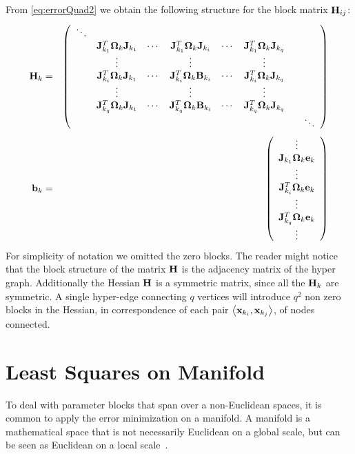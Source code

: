 \documentclass[a4paper]{article}
\begin{document}
From \eqref{eq:errorQuad2} we obtain the following structure for the block matrix $\mathbf{H}_{ij}$:
\begin{eqnarray}
\mathbf{H}_{k}&=&\left(
\begin{array}{cccccccc}
\ddots & & & & & & &\\
& \mathbf{J}_{k_1}^T \mathbf{\Omega}_{k} \mathbf{J}_{k_1} & \cdots & \mathbf{J}_{k_1}^T \mathbf{\Omega}_{k} \mathbf{J}_{k_i} & \cdots & \mathbf{J}_{k_1}^T \mathbf{\Omega}_{k} \mathbf{J}_{k_q} &\\
& \vdots & & \vdots & & \vdots & \\
& \mathbf{J}_{k_i}^T \mathbf{\Omega}_{k} \mathbf{J}_{k_1} & \cdots & \mathbf{J}_{k_i}^T \mathbf{\Omega}_{k} \mathbf{B}_{k_i} & \cdots & \mathbf{J}_{k_i}^T \mathbf{\Omega}_{k} \mathbf{J}_{k_q} & \\
& \vdots & & \vdots & & \vdots & \\
& \mathbf{J}_{k_q}^T \mathbf{\Omega}_{k} \mathbf{J}_{k_1} & \cdots & \mathbf{J}_{k_q}^T \mathbf{\Omega}_{k} \mathbf{B}_{k_i} & \cdots & \mathbf{J}_{k_q}^T \mathbf{\Omega}_{k} \mathbf{J}_{k_q} & \\
& &&&&&& \ddots \\
\end{array}
\right) \\
\mathbf{b}_{k}&=&\left(
\begin{array}{c}
\vdots\\
\mathbf{J}_{k_1} \mathbf{\Omega}_{k} \mathbf{e}_{k}\\
\vdots\\
\mathbf{J}_{k_i}^T \mathbf{\Omega}_{k} \mathbf{e}_{k}\\
\vdots\\
\mathbf{J}_{k_q}^T \mathbf{\Omega}_{k} \mathbf{e}_{k}\\
\vdots\\
\end{array}
\right)
\end{eqnarray}
For simplicity of notation we omitted the zero blocks.  The reader
might notice that the block structure of the matrix $\mathbf{H}$ is the
adjacency matrix of the hyper graph.  Additionally the Hessian $\mathbf{H}$
is a symmetric matrix, since all the $\mathbf{H}_k$ are symmetric. A single
hyper-edge connecting $q$ vertices will introduce $q^2$ non zero
blocks in the Hessian, in correspondence of each pair $\left<
\mathbf{x}_{k_i}, \mathbf{x}_{k_j} \right>$, of nodes connected.


\section{Least Squares on Manifold}
\label{sec:manifold}

To deal with parameter blocks that span over a non-Euclidean spaces,
it is common to apply the error minimization on a manifold.  A
manifold is a mathematical space that is not necessarily Euclidean on
a global scale, but can be seen as Euclidean on a local
scale~\cite{Lee2003SmoothManifolds}.
\end{document}
